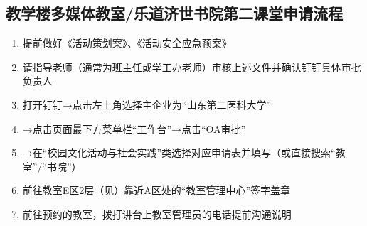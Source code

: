 \subsection[教学楼多媒体教室/乐道济世书院第二课堂申请流程]{教学楼多媒体教室/乐道济世书院第二课堂申请流程}
\begin{enumerate}
    \item 提前做好《活动策划案》、《活动安全应急预案》
    \item 请指导老师（通常为班主任或学工办老师）审核上述文件并确认钉钉具体审批负责人
    \item 打开钉钉→点击左上角选择主企业为“山东第二医科大学”
    \item →点击页面最下方菜单栏“工作台”→点击“OA审批”
    \item →在“校园文化活动与社会实践”类选择对应申请表并填写（或直接搜索“教室”/“书院”）
    \item 前往教室E区2层（见）靠近A区处的“教室管理中心”签字盖章
    \item 前往预约的教室，拨打讲台上教室管理员的电话提前沟通说明
\end{enumerate}

